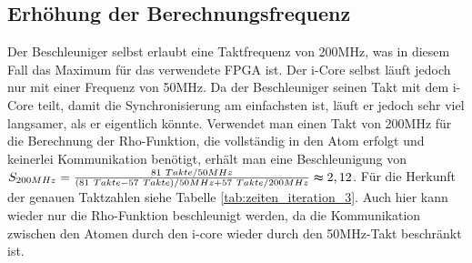 \subsection{Erhöhung der Berechnungsfrequenz}
Der Beschleuniger selbst erlaubt eine Taktfrequenz von 200MHz, was in diesem Fall das Maximum für das verwendete FPGA ist. Der i-Core selbst
läuft jedoch nur mit einer Frequenz von 50MHz. Da der Beschleuniger seinen Takt mit dem i-Core teilt, damit die Synchronisierung am einfachsten ist,
läuft er jedoch sehr viel langsamer, als er eigentlich könnte. Verwendet man einen Takt von 200MHz
für die Berechnung der Rho-Funktion, die vollständig in den Atom erfolgt und keinerlei Kommunikation benötigt, erhält man eine Beschleunigung von
$S_{200MHz} = \frac{81\ Takte / 50MHz}{(81\ Takte - 57\ Takte) / 50MHz + 57\ Takte / 200MHz} \thickapprox 2,12$.
Für die Herkunft der genauen Taktzahlen siehe Tabelle \ref{tab:zeiten_iteration_3}. Auch hier kann wieder nur die Rho-Funktion beschleunigt werden,
da die Kommunikation zwischen den Atomen durch den i-core wieder durch den 50MHz-Takt beschränkt ist.

